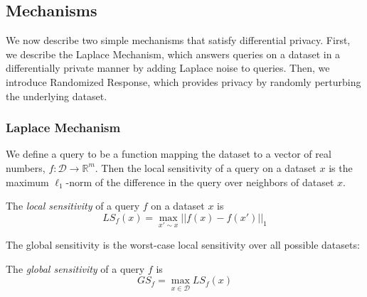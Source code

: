 \subsection*{Mechanisms}

We now describe two simple mechanisms that satisfy differential privacy. First, we describe the Laplace Mechanism, which answers queries on a dataset in a differentially private manner by adding Laplace noise to queries. Then, we introduce Randomized Response, which  provides privacy by randomly perturbing the underlying dataset.

\subsubsection{Laplace Mechanism}

 We define a query to be a function mapping the dataset to a vector of real numbers, $f: \mathcal{D} \to \mathbb{R}^m$. Then the local sensitivity of a query on a dataset $x$ is the maximum $\ell_1$-norm of the difference in the query over neighbors of dataset $x$.

\begin{definition}
The \emph{local sensitivity} of a query $f$ on a dataset $x$ is $$LS_f(x) = \max_{x' \sim x} ||f(x) - f(x')||_1$$
\end{definition}
The global sensitivity is the worst-case local sensitivity over all possible datasets:
\begin{definition}
The \emph{global sensitivity} of a query $f$ is $$GS_f = \max_{x \in \mathcal{D}} LS_f(x)$$
\end{definition}

